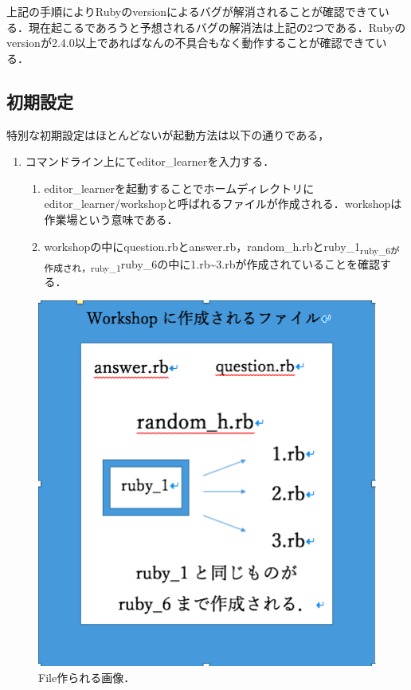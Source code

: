 \documentclass[11pt,dvipdfmx]{jsarticle}
\providecommand{\tightlist}{%
      \setlength{\itemsep}{0pt}\setlength{\parskip}{0pt}}
\begin{document}
上記の手順によりRubyのversionによるバグが解消されることが確認できている．現在起こるであろうと予想されるバグの解消法は上記の2つである．Rubyのversionが2.4.0以上であればなんの不具合もなく動作することが確認できている．

    \subsection{初期設定}\label{ux521dux671fux8a2dux5b9a}

    特別な初期設定はほとんどないが起動方法は以下の通りである，

\begin{enumerate}
\def\labelenumi{\arabic{enumi}.}
\tightlist
\item
  コマンドライン上にてeditor\_learnerを入力する．

  \begin{enumerate}
  \def\labelenumii{\arabic{enumii}.}
  \setcounter{enumii}{1}
  \tightlist
  \item
    editor\_learnerを起動することでホームディレクトリにeditor\_learner/workshopと呼ばれるファイルが作成される．workshopは作業場という意味である．
  \item
    workshopの中にquestion.rbとanswer.rb，random\_h.rbとruby\_1\textsubscript{ruby\_6が作成され，ruby\_1}ruby\_6の中に1.rb\textasciitilde{}3.rbが作成されていることを確認する．
  \end{enumerate}
\end{enumerate}

\begin{figure}[H]
\centering
\begin{center}
\includegraphics[width=150mm]{../../picture/mkdir.png}
\end{center}
\caption{File作られる画像．\label{sample}}

\label{fig:This}
\end{figure}
\end{document}
